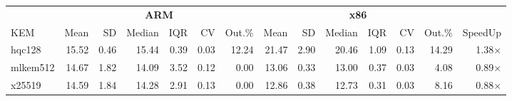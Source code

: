 \begin{table}[!ht]
\centering
\begin{tabular}{l|rrrrrr|rrrrrr|r}
\toprule
& \multicolumn{6}{c}{\bfseries ARM} & \multicolumn{6}{c}{\bfseries x86} & \\
\cmidrule(lr){2-7} \cmidrule(lr){8-13}
KEM & Mean & SD & Median & IQR & CV & Out.\% & Mean & SD & Median & IQR & CV & Out.\% & SpeedUp \\
\midrule
hqc128 & 15.52 & 0.46 & 15.44 & 0.39 & 0.03 & 12.24 & 21.47 & 2.90 & 20.46 & 1.09 & 0.13 & 14.29 & 1.38× \\
mlkem512 & 14.67 & 1.82 & 14.09 & 3.52 & 0.12 & 0.00 & 13.06 & 0.33 & 13.00 & 0.37 & 0.03 & 4.08 & 0.89× \\
x25519 & 14.59 & 1.84 & 14.28 & 2.91 & 0.13 & 0.00 & 12.86 & 0.38 & 12.73 & 0.31 & 0.03 & 8.16 & 0.88× \\
\bottomrule
\end{tabular}
\end{table}
